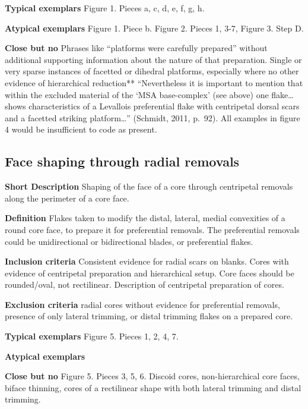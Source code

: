 \documentclass[
]{article}
\begin{document}
\textbf{Typical exemplars} Figure 1. Pieces a, c, d, e, f, g, h.

\textbf{Atypical exemplars} Figure 1. Piece b. Figure 2. Pieces 1, 3-7,
Figure 3. Step D.

\textbf{Close but no} Phrases like ``platforms were carefully prepared''
without additional supporting information about the nature of that
preparation. Single or very sparse instances of facetted or dihedral
platforms, especially where no other evidence of hierarchical
reduction** ``Nevertheless it is important to mention that within the
excluded material of the `MSA base-complex' (see above) one
flake\ldots{} shows characteristics of a Levallois preferential flake
with centripetal dorsal scars and a facetted striking platform\ldots{}''
(Schmidt, 2011, p.~92). All examples in figure 4 would be insufficient
to code as present.

\hypertarget{face-shaping-through-radial-removals}{%
\subsection{Face shaping through radial
removals}\label{face-shaping-through-radial-removals}}

\textbf{Short Description} Shaping of the face of a core through
centripetal removals along the perimeter of a core face.

\textbf{Definition} Flakes taken to modify the distal, lateral, medial
convexities of a round core face, to prepare it for preferential
removals. The preferential removals could be unidirectional or
bidirectional blades, or preferential flakes.

\textbf{Inclusion criteria} Consistent evidence for radial scars on
blanks. Cores with evidence of centripetal preparation and hierarchical
setup. Core faces should be rounded/oval, not rectilinear. Description
of centripetal preparation of cores.

\textbf{Exclusion criteria} radial cores without evidence for
preferential removals, presence of only lateral trimming, or distal
trimming flakes on a prepared core.

\textbf{Typical exemplars} Figure 5. Pieces 1, 2, 4, 7.

\textbf{Atypical exemplars}

\textbf{Close but no} Figure 5. Pieces 3, 5, 6. Discoid cores,
non-hierarchical core faces, biface thinning, cores of a rectilinear
shape with both lateral trimming and distal trimming.
\end{document}
